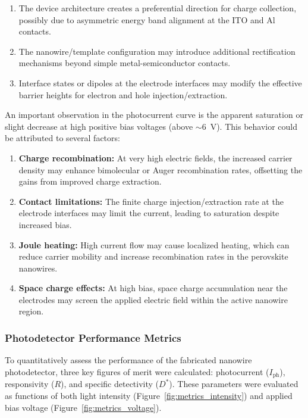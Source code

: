 \documentclass{rapportCS}
\begin{document}
	\begin{enumerate}
		\item The device architecture creates a preferential direction for charge collection, possibly due to asymmetric energy band alignment at the ITO and Al contacts.
		\item The nanowire/template configuration may introduce additional rectification mechanisms beyond simple metal-semiconductor contacts.
		\item Interface states or dipoles at the electrode interfaces may modify the effective barrier heights for electron and hole injection/extraction.
	\end{enumerate}
	
	An important observation in the photocurrent curve is the apparent saturation or slight decrease at high positive bias voltages (above $\sim 6$~V). This behavior could be attributed to several factors:
	
	\begin{enumerate}
		\item \textbf{Charge recombination:} At very high electric fields, the increased carrier density may enhance bimolecular or Auger recombination rates, offsetting the gains from improved charge extraction.
		\item \textbf{Contact limitations:} The finite charge injection/extraction rate at the electrode interfaces may limit the current, leading to saturation despite increased bias.
		\item \textbf{Joule heating:} High current flow may cause localized heating, which can reduce carrier mobility and increase recombination rates in the perovskite nanowires.
		\item \textbf{Space charge effects:} At high bias, space charge accumulation near the electrodes may screen the applied electric field within the active nanowire region.
	\end{enumerate}
	
	\subsubsection{Photodetector Performance Metrics}
	
	To quantitatively assess the performance of the fabricated  nanowire photodetector, three key figures of merit were calculated: photocurrent ($I_{\text{ph}}$), responsivity ($R$), and specific detectivity ($D^{\ast}$). These parameters were evaluated as functions of both light intensity (Figure~\ref{fig:metrics_intensity}) and applied bias voltage (Figure~\ref{fig:metrics_voltage}).
	
\end{document}
